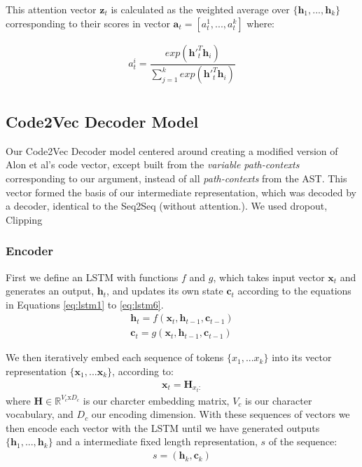 This attention vector $\textbf{z}_t$ is calculated as the weighted average over  $\{\textbf{h}_1,...,\textbf{h}_k\}$ corresponding to their scores in vector $\textbf{a}_t = [a_t^1,...,a_t^k]$ where:



\begin{align}
    a_t^i = \dfrac{exp(\mathbf{h}'^{T}_t\mathbf{h}_i)}{\sum_{j=1}^kexp(\mathbf{h}'^{T}_t\mathbf{h}_i)} \\
\end{align}


\subsection{Code2Vec Decoder Model} %
\label{sec:code2vec_decoder_model}

Our Code2Vec Decoder model centered around creating a modified version of Alon et al's \cite{alon_code2vec_2018} code vector, except built from the \textit{variable path-contexts} corresponding to our argument, instead of all \textit{path-contexts} from the AST.
This vector formed the basis of our intermediate representation, which was decoded by a decoder, identical to the Seq2Seq (without attention.).
We used dropout, 
Clipping


\subsubsection{Encoder}

First we define an LSTM with functions $f$ and $g$, which takes input vector $\textbf{x}_t$ and generates an output, $\textbf{h}_t$, and updates its own state $\textbf{c}_t$ according to the equations in Equations \ref{eq:lstm1} to \ref{eq:lstm6}.
\begin{align}
    \textbf{h}_t = f(\textbf{x}_t, \textbf{h}_{t-1}, \textbf{c}_{t-1}) \label{eq:s2sh}\\
    \textbf{c}_t = g(\textbf{x}_t, \textbf{h}_{t-1}, \textbf{c}_{t-1}) \label{eq:s2sc}
\end{align}

We then iteratively embed each sequence of tokens $\{x_1,...x_k\}$ into its vector representation $\{\textbf{x}_1,...\textbf{x}_k\}$, according to:
\begin{align}
    \textbf{x}_t = \mathbf{H}_{x_t:}
\end{align}
where $\textbf{H} \in \mathbb{R}^{V_c\text{x}D_c}$ is our charcter embedding matrix, $V_c$ is our character vocabulary, and $D_c$ our encoding dimension.
With these sequences of vectors we then encode each vector with the LSTM until we have generated outputs $\{\textbf{h}_1,...,\textbf{h}_k\}$ and a intermediate fixed length representation, $s$ of the sequence: 
\begin{align}
     s = (\textbf{h}_k, \textbf{c}_k) \label{eq:s2s_state}
\end{align}

